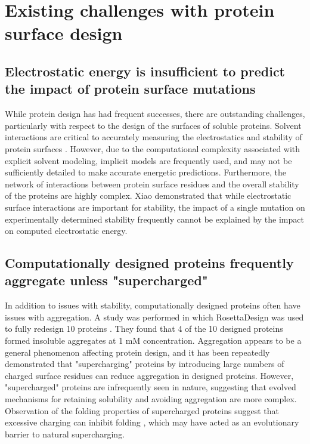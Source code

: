 \section{Existing challenges with protein surface design}

\subsection{Electrostatic energy is insufficient to predict the impact of protein surface mutations}
While protein design has had frequent successes, there are outstanding challenges, particularly with respect to the design of the surfaces of soluble proteins.
Solvent interactions are critical to accurately measuring the electrostatics and stability of protein surfaces  \citep{Park:2004kn}.
However, due to the computational complexity associated with explicit solvent modeling, implicit models are frequently used, and may not be sufficiently detailed to make accurate energetic predictions.
Furthermore, the network of interactions between protein surface residues and the overall stability of the proteins are highly complex.
Xiao  \citep{Xiao:2013dq} demonstrated that while electrostatic surface interactions are important for stability, the impact of a single mutation on experimentally determined stability frequently cannot be explained by the impact on computed electrostatic energy.

\subsection{Computationally designed proteins frequently aggregate unless "supercharged"}
In addition to issues with stability, computationally designed proteins often have issues with aggregation.
A study was performed in which RosettaDesign was used to fully redesign 10 proteins \citep{Dantas:2003vt}.
They found that 4 of the 10 designed proteins formed insoluble aggregates at 1 mM concentration.
Aggregation appears to be a general phenomenon affecting protein design, and it has been repeatedly demonstrated that "supercharging" proteins by introducing large numbers of charged surface residues \citep{Simeonov:2011jf,Kurnik:2012dz,MichaelSLawrence:2007cv} can reduce aggregation in designed proteins.
However, "supercharged" proteins are infrequently seen in nature, suggesting that evolved mechanisms for retaining solubility and avoiding aggregation are more complex.
Observation of the folding properties of supercharged proteins suggest that excessive charging can inhibit folding \citep{MichaelSLawrence:2007cv}, which may have acted as an evolutionary  barrier to natural supercharging.

